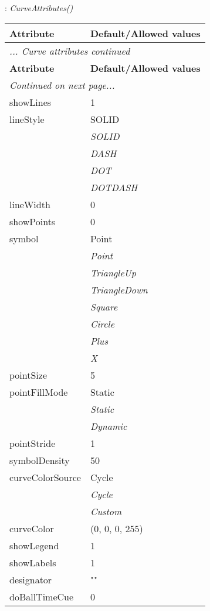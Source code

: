 \documentclass[10pt,a4paper]{report}
\begin{document}
\newpage

{}
: {\it CurveAttributes() }\\[-3mm]

\begin{longtable}{ll}
{\bf Attribute} & {\bf Default/Allowed values} \\
\hline \hline
\endfirsthead
\multicolumn{2}{l}{{\it ... Curve attributes continued}} \\
{\bf Attribute} & {\bf Default/Allowed values} \\
\hline \hline
\endhead
\hline
\multicolumn{2}{l}{{\it Continued on next page...}} \\
\endfoot
\hline
\endlastfoot

showLines  &  1 \\
lineStyle  &  SOLID   \\
 & {\it  SOLID} \\
 & {\it  DASH} \\
 & {\it  DOT} \\
 & {\it  DOTDASH} \\
lineWidth  &  0 \\
showPoints  &  0 \\
symbol  &  Point   \\
 & {\it  Point} \\
 & {\it  TriangleUp} \\
 & {\it  TriangleDown} \\
 & {\it  Square} \\
 & {\it  Circle} \\
 & {\it  Plus} \\
 & {\it  X} \\
pointSize  &  5 \\
pointFillMode  &  Static   \\
 & {\it  Static} \\
 & {\it  Dynamic} \\
pointStride  &  1 \\
symbolDensity  &  50 \\
curveColorSource  &  Cycle   \\
 & {\it  Cycle} \\
 & {\it  Custom} \\
curveColor  &  (0, 0, 0, 255) \\
showLegend  &  1 \\
showLabels  &  1 \\
designator  &  "" \\
doBallTimeCue  &  0 \\

\end{longtable}
\end{document}
